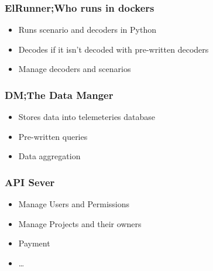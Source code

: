 \documentclass{../iot-lecture}
\begin{document}
\begin{frame}
  \frametitle{ElRunner;\@ Who runs in dockers}
  \begin{itemize}
    \item Runs scenario and decoders in Python
    \item Decodes if it isn't decoded with pre-written decoders
    \item Manage decoders and scenarios
  \end{itemize}
\end{frame}

\begin{frame}
  \frametitle{DM;\@ The Data Manger}
  \begin{itemize}
    \item Stores data into telemeteries database
    \item Pre-written queries
    \item Data aggregation
  \end{itemize}
\end{frame}

\begin{frame}
  \frametitle{API Sever}
  \begin{itemize}
    \item Manage Users and Permissions
    \item Manage Projects and their owners
    \item Payment
    \item \ldots
  \end{itemize}
\end{frame}
\end{document}
